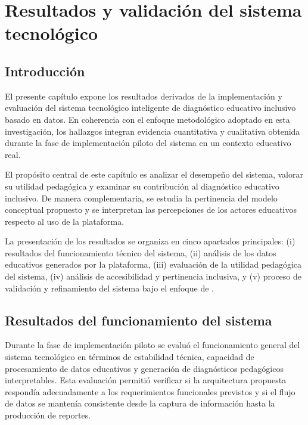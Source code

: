 \chapter{Resultados y validación del sistema tecnológico}

\begin{refsection}

\section{Introducción}

El presente capítulo expone los resultados derivados de la implementación y evaluación del sistema tecnológico inteligente de diagnóstico educativo inclusivo basado en datos. En coherencia con el enfoque metodológico adoptado en esta investigación, los hallazgos integran evidencia cuantitativa y cualitativa obtenida durante la fase de implementación piloto del sistema en un contexto educativo real.

El propósito central de este capítulo es analizar el desempeño del sistema, valorar su utilidad pedagógica y examinar su contribución al diagnóstico educativo inclusivo. De manera complementaria, se estudia la pertinencia del modelo conceptual propuesto y se interpretan las percepciones de los actores educativos respecto al uso de la plataforma.

La presentación de los resultados se organiza en cinco apartados principales: (i) resultados del funcionamiento técnico del sistema, (ii) análisis de los datos educativos generados por la plataforma, (iii) evaluación de la utilidad pedagógica del sistema, (iv) análisis de accesibilidad y pertinencia inclusiva, y (v) proceso de validación y refinamiento del sistema bajo el enfoque de \DBR.

\section{Resultados del funcionamiento del sistema}

Durante la fase de implementación piloto se evaluó el funcionamiento general del sistema tecnológico en términos de estabilidad técnica, capacidad de procesamiento de datos educativos y generación de diagnósticos pedagógicos interpretables. Esta evaluación permitió verificar si la arquitectura propuesta respondía adecuadamente a los requerimientos funcionales previstos y si el flujo de datos se mantenía consistente desde la captura de información hasta la producción de reportes.


\end{refsection}
